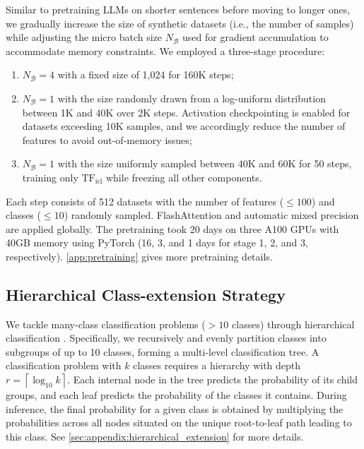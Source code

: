 \documentclass{article}
\theoremstyle{plain}
\theoremstyle{definition}
\theoremstyle{remark}
\newcommand{\TFicl}{\text{TF}_{\text{icl}}}
\begin{document}
Similar to pretraining LLMs on shorter sentences before moving to longer ones, we gradually increase the size of synthetic datasets (i.e., the number of samples) while adjusting the micro batch size \( N_{\mathcal{B}} \) used for gradient accumulation to accommodate memory constraints. We employed a three-stage procedure:
\begin{enumerate}[itemsep=2pt, parsep=0pt, topsep=0pt]
    \item \( N_{\mathcal{B}} = 4 \) with a fixed size of 1,024 for 160K steps;
    \item \( N_{\mathcal{B}} = 1 \) with the size randomly drawn from a log-uniform distribution between 1K and 40K over 2K steps. Activation checkpointing is enabled for datasets exceeding 10K samples, and we accordingly reduce the number of features to avoid out-of-memory issues;
    \item \( N_{\mathcal{B}} = 1 \) with the size uniformly sampled between 40K and 60K for 50 steps, training only \( \TFicl \) while freezing all other components.
\end{enumerate}

Each step consists of 512 datasets with the number of features ($\le 100$) and classes ($\le 10$) randomly sampled. FlashAttention and automatic mixed precision are applied globally. The pretraining took 20 days on three A100 GPUs with 40GB memory using PyTorch (16, 3, and 1 days for stage 1, 2, and 3, respectively). \cref{app:pretraining} gives more pretraining details.

\subsection{Hierarchical Class-extension Strategy} \label{sec:hierarchical_classification}

We tackle many-class classification problems ($>10$ classes) through hierarchical classification \cite{sillaSurveyHierarchicalClassification2011}. Specifically, we recursively and evenly partition classes into subgroups of up to 10 classes, forming a multi-level classification tree. A classification problem with $k$ classes requires a hierarchy with depth $r = \left\lceil \log_{10} k \right\rceil$. Each internal node in the tree predicts the probability of its child groups, and each leaf predicts the probability of the classes it contains. During inference, the final probability for a given class is obtained by multiplying the probabilities across all nodes situated on the unique root-to-leaf path leading to this class. See \cref{sec:appendix:hierarchical_extension} for more details.
\end{document}
